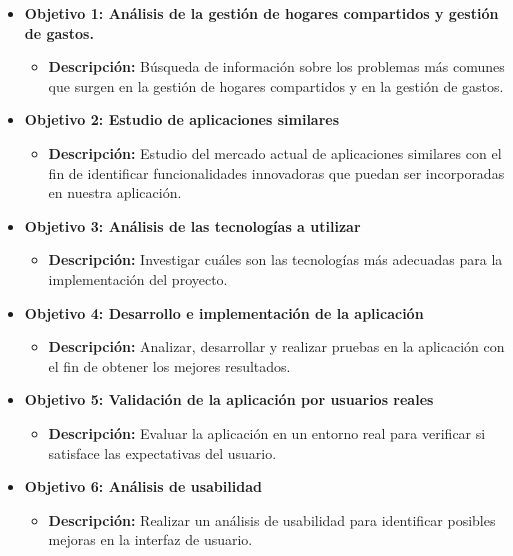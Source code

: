 \documentclass{article}
\begin{document}
\begin{itemize}
	\item\textbf{Objetivo 1: Análisis de la gestión de hogares compartidos y gestión de gastos.}
	\begin{itemize}
		\item \textbf{Descripción:} Búsqueda de información sobre los problemas más comunes que surgen en la gestión de hogares compartidos y en la gestión de gastos.
	\end{itemize} 

	\item \textbf{Objetivo 2: Estudio de aplicaciones similares}
	\begin{itemize}
		\item \textbf{Descripción:} Estudio del mercado actual de aplicaciones similares con el fin de identificar funcionalidades innovadoras que puedan ser incorporadas en nuestra aplicación.
	\end{itemize}

	\item \textbf{Objetivo 3: Análisis de las tecnologías a utilizar}
	\begin{itemize}
		\item \textbf{Descripción:} Investigar cuáles son las tecnologías más adecuadas para la implementación del proyecto.
	\end{itemize}
	
	\item \textbf{Objetivo 4: Desarrollo e implementación de la aplicación}
	\begin{itemize}
		\item \textbf{Descripción:} Analizar, desarrollar y realizar pruebas en la aplicación con el fin de obtener los mejores resultados.
	\end{itemize}
	
	\item \textbf{Objetivo 5: Validación de la aplicación por usuarios reales}
	\begin{itemize}
		\item \textbf{Descripción:} Evaluar la aplicación en un entorno real para verificar si satisface las expectativas del usuario.
	\end{itemize}
    \item \textbf{Objetivo 6: Análisis de usabilidad}
    \begin{itemize}
        \item \textbf{Descripción:} Realizar un análisis de usabilidad para identificar posibles mejoras en la interfaz de usuario.
    \end{itemize}
\end{itemize}
\end{document}
